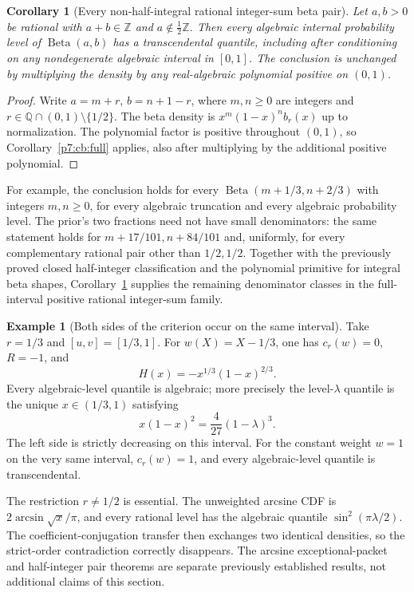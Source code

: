 \documentclass[11pt,a4paper]{article}
\newtheorem{corollary}[theorem]{Corollary}
\theoremstyle{definition}
\newtheorem{example}[theorem]{Example}
\theoremstyle{remark}
\numberwithin{equation}{section}
\begin{document}
\begin{corollary}[Every non-half-integral rational integer-sum beta pair]
\label{p7:cb:beta}
Let $a,b>0$ be rational with $a+b\in\mathbb Z$ and
$a\notin\tfrac12\mathbb Z$. Then every algebraic internal
probability level of $\operatorname{Beta}(a,b)$ has a
transcendental quantile, including after conditioning on any
nondegenerate algebraic interval in $[0,1]$.
The conclusion is unchanged by multiplying the density by any
real-algebraic polynomial positive on $(0,1)$.
\end{corollary}

\begin{proof}
Write $a=m+r$, $b=n+1-r$, where $m,n\ge0$ are integers
and $r\in\mathbb Q\cap(0,1)\setminus\{1/2\}$.
The beta density is $x^m(1-x)^n b_r(x)$ up to normalization.
The polynomial factor is positive throughout $(0,1)$, so
Corollary~\ref{p7:cb:full} applies, also after multiplying by
the additional positive polynomial.
\end{proof}

For example, the conclusion holds for every
$\operatorname{Beta}(m+1/3,n+2/3)$ with integers $m,n\ge0$,
for every algebraic truncation and every algebraic probability level.
The prior's two fractions need not have small denominators: the same
statement holds for $m+17/101,n+84/101$ and, uniformly, for every
complementary rational pair other than $1/2,1/2$.
Together with the previously proved closed half-integer classification
and the polynomial primitive for integral beta shapes,
Corollary~\ref{p7:cb:beta} supplies the remaining denominator classes in
the full-interval positive rational integer-sum family.

\begin{example}[Both sides of the criterion occur on the same interval]
\label{p7:cb:example}
Take $r=1/3$ and $[u,v]=[1/3,1]$.
For $w(X)=X-1/3$, one has $c_r(w)=0$, $R=-1$, and
\[
 H(x)=-x^{1/3}(1-x)^{2/3}.
\]
Every algebraic-level quantile is algebraic; more precisely the
level-$\lambda$ quantile is the unique $x\in(1/3,1)$ satisfying
\[
 x(1-x)^2=\frac4{27}(1-\lambda)^3.
\]
The left side is strictly decreasing on this interval.
For the constant weight $w=1$ on the very same interval,
$c_r(w)=1$, and every algebraic-level quantile is transcendental.
\end{example}

The restriction $r\ne1/2$ is essential. The unweighted arcsine CDF
is $2\arcsin\sqrt{x}/\pi$, and every rational
level has the algebraic quantile $\sin^2(\pi\lambda/2)$.
The coefficient-conjugation transfer then exchanges two identical
densities, so the strict-order contradiction correctly disappears.
The arcsine exceptional-packet and half-integer pair theorems are
separate previously established results, not additional claims of this
section.
\end{document}
